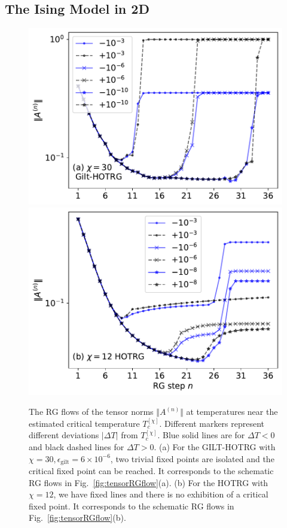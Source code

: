 \documentclass[aps,prr,reprint,superscriptaddress,floatfix]{revtex4-2}
\begin{document}
\subsection{The Ising Model in 2D\label{benchmark:2DIsing}}
\begin{figure}[tb]
    \includegraphics[width=\columnwidth]{./figures/AnormFlow-a.pdf}
    \includegraphics[width=\columnwidth]{./figures/AnormFlow-b.pdf}
    \caption{\label{fig:flowAnorm}
        The RG flows of the tensor norms $\Vert A^{(n)} \Vert$ at temperatures near the estimated critical temperature $T_c^{[\chi]}$. 
        Different markers represent different deviations $| \Delta T| $ from $T_c^{[\chi]}$. Blue solid lines are for $\Delta T<0$ and black dashed lines for $\Delta T>0$. 
        (a) For the GILT-HOTRG with $\chi = 30,\epsilon_{\text{gilt}} = 6\times 10^{-6}$, two trivial fixed points are isolated and the critical fixed point can be reached. It corresponds to the schematic RG flows in Fig.~\ref{fig:tensorRGflow}(a). 
        (b) For the HOTRG with $\chi = 12$, we have fixed lines and there is no exhibition of a critical fixed point. 
        It corresponds to the schematic RG flows in Fig.~\ref{fig:tensorRGflow}(b).
    }
\end{figure}
\end{document}

